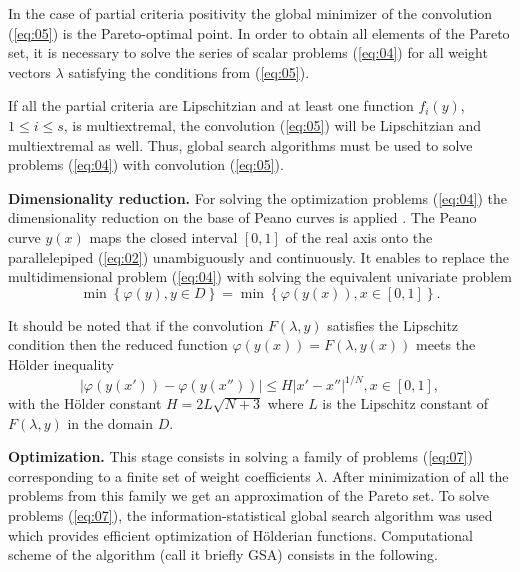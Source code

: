 \documentclass[runningheads]{llncs}
\begin{document}

In the case of partial criteria positivity the global minimizer of the convolution (\ref{eq:05}) is the Pareto-optimal point. In order to obtain all elements of the Pareto set, it is necessary to solve the series of scalar problems (\ref{eq:04}) for all weight vectors $\lambda$ satisfying the conditions from (\ref{eq:05}). 

If all the partial criteria are Lipschitzian and at least one function $f_i(y)$, $1 \leq i \leq s$, is multiextremal, the convolution (\ref{eq:05}) will be Lipschitzian and multiextremal as well. Thus, global search algorithms must be used to solve problems (\ref{eq:04}) with convolution (\ref{eq:05}).

\textbf{Dimensionality reduction.} For solving the optimization problems (\ref{eq:04}) the dimensionality reduction on the base of Peano curves is applied \cite{Gergel2019_2,Gergel2018,GergelKozinov2020,Lera2024,LERA2021125660}. The Peano curve $y(x)$ maps the closed interval $[0,1]$ of the real axis onto the parallelepiped (\ref{eq:02}) unambiguously and continuously. It enables to replace the multidimensional problem (\ref{eq:04}) with solving the equivalent univariate problem
\begin{equation}
\label{eq:07}
\min \left\{\varphi(y), y \in D\right\} = \min\left\{ \varphi(y(x)), x \in [0,1] \right\}.
\end{equation}

It should be noted that if the convolution $F(\lambda,y)$ satisfies the Lipschitz condition then the reduced function $\varphi(y(x)) = F(\lambda,y(x))$ meets the H{\" o}lder inequality
\begin{equation}
\label{eq:08}
|\varphi(y(x')) - \varphi(y(x''))| \leq H |x' - x''|^{1/N} , x \in [0,1],
\end{equation}
with the H{\" o}lder constant $H=2L\sqrt{N+3}$ where $L$ is the Lipschitz constant of $F(\lambda,y)$ in the domain $D$.

\textbf{Optimization.} This stage consists in solving a family of problems (\ref{eq:07}) corresponding to a finite set of weight coefficients $\lambda$. After minimization of all the problems from this family we get an approximation of the Pareto set. To solve problems (\ref{eq:07}), the information-statistical global search algorithm \cite{ML_MCO_2023,Gergel2019_2,Gergel2018,GergelKozinov2020,Strongin2000,Sergeyev2013} was used which provides efficient optimization of H{\" o}lderian functions. Computational scheme of the algorithm (call it briefly GSA) consists in the following.
\end{document}
